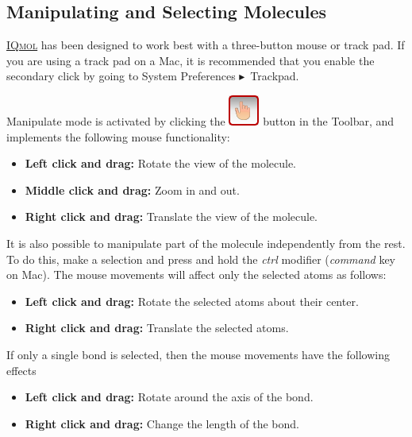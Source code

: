\documentclass[a4paper,12pt]{article}
\newcommand{\iqmol}{\href{http://iqmol.org}{{\scshape IQmol}}}
\newcommand{\bt}{\ensuremath{\blacktriangleright}}
\begin{document}
\subsection{Manipulating and Selecting Molecules}
\label{sec:mousemodes}

\iqmol{} has been designed to work best with a three-button mouse or track pad.
If you are using a track pad on a  Mac, it is recommended that you enable the
secondary click by going to System Preferences \bt\ Trackpad.

Manipulate mode is activated by clicking the
\includegraphics[scale=0.40]{figures/ManipulateButton.png} button in the
Toolbar, and implements the following mouse functionality:
\begin{itemize}
\item {\bf Left click and drag:} Rotate the view of the molecule.  
\item {\bf Middle click and drag:} Zoom in and out.  
\item {\bf Right click and drag:} Translate the view of the molecule.
\end{itemize}

It is also possible to manipulate part of the molecule independently from the
rest.  To do this, make a selection and press and hold the \emph{ctrl} modifier
(\emph{command} key on Mac).  The mouse movements will affect only the 
selected atoms as follows:
\begin{itemize}
\item {\bf Left click and drag:} Rotate the selected atoms about their center. 
\item {\bf Right click and drag:} Translate the selected atoms.  
\end{itemize}
If only a single bond is selected, then the mouse movements have the following effects
\begin{itemize}
\item {\bf Left click and drag:} Rotate around the axis of the bond.
\item {\bf Right click and drag:} Change the length of the bond.
\end{itemize}
\end{document}

